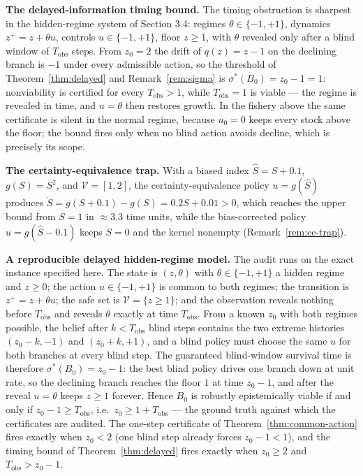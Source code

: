 \documentclass[10pt,twocolumn]{article}
\theoremstyle{definition}
\begin{document}
\textbf{The delayed-information timing bound.} The timing obstruction is sharpest in the hidden-regime system of Section 3.4: regimes \(\theta \in \{-1, +1\}\), dynamics \(z^{+} = z + \theta u\), controls \(u \in \{-1, +1\}\), floor \(z \ge 1\), with \(\theta\) revealed only after a blind window of \(T_{\mathrm{obs}}\) steps. From \(z_{0} = 2\) the drift of \(q(z) = z - 1\) on the declining branch is \(-1\) under every admissible action, so the threshold of Theorem~\ref{thm:delayed} and Remark~\ref{rem:sigma} is \(\sigma^{*}(B_{0}) = z_{0} - 1 = 1\): nonviability is certified for every \(T_{\mathrm{obs}} > 1\), while \(T_{\mathrm{obs}} = 1\) is viable --- the regime is revealed in time, and \(u = \theta\) then restores growth. In the fishery above the same certificate is silent in the normal regime, because \(u_{0} = 0\) keeps every stock above the floor; the bound fires only when no blind action avoids decline, which is precisely its scope.

\textbf{The certainty-equivalence trap.} With a biased index \(\hat{S} = S + 0.1\), \(g(S) = S^{2}\), and \(\mathcal{V} = [1,2]\), the certainty-equivalence policy \(u = g(\hat{S})\) produces \(\dot{S} = g(S+0.1) - g(S) = 0.2S + 0.01 > 0\), which reaches the upper bound from \(S = 1\) in \(\approx 3.3\) time units, while the bias-corrected policy \(u = g(\hat{S} - 0.1)\) keeps \(\dot{S} = 0\) and the kernel nonempty (Remark~\ref{rem:ce-trap}).

\textbf{A reproducible delayed hidden-regime model.} The audit runs on the exact instance specified here. The state is \((z, \theta)\) with \(\theta \in \{-1, +1\}\) a hidden regime and \(z \ge 0\); the action \(u \in \{-1, +1\}\) is common to both regimes; the transition is \(z^{+} = z + \theta u\); the safe set is \(\mathcal{V} = \{ z \ge 1 \}\); and the observation reveals nothing before \(T_{\mathrm{obs}}\) and reveals \(\theta\) exactly at time \(T_{\mathrm{obs}}\). From a known \(z_{0}\) with both regimes possible, the belief after \(k < T_{\mathrm{obs}}\) blind steps contains the two extreme histories \((z_{0} - k, -1)\) and \((z_{0} + k, +1)\), and a blind policy must choose the same \(u\) for both branches at every blind step. The guaranteed blind-window survival time is therefore \(\sigma^{*}(B_{0}) = z_{0} - 1\): the best blind policy drives one branch down at unit rate, so the declining branch reaches the floor \(1\) at time \(z_{0} - 1\), and after the reveal \(u = \theta\) keeps \(z \ge 1\) forever. Hence \(B_{0}\) is robustly epistemically viable if and only if \(z_{0} - 1 \ge T_{\mathrm{obs}}\), i.e.\ \(z_{0} \ge 1 + T_{\mathrm{obs}}\) --- the ground truth against which the certificates are audited. The one-step certificate of Theorem~\ref{thm:common-action} fires exactly when \(z_{0} < 2\) (one blind step already forces \(z_{0} - 1 < 1\)), and the timing bound of Theorem~\ref{thm:delayed} fires exactly when \(z_{0} \ge 2\) and \(T_{\mathrm{obs}} > z_{0} - 1\).
\end{document}
